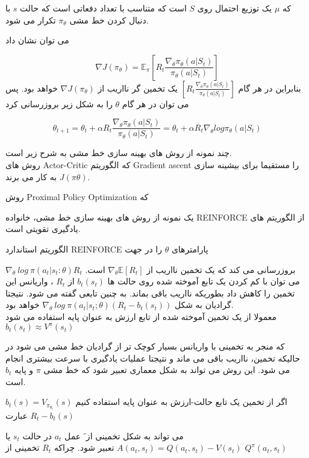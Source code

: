 که $\mu$ یک توزیع احتمال روی $S$ است که متناسب با تعداد دفعاتی است که حالت $s$ با دنبال کردن خط مشی 
$\pi_\theta$
 تکرار می شود.


می توان نشان داد 
\cite{(suttonbook)}

$$\nabla J(\pi_\theta) = \mathbb{E}_\pi \left[ R_t \frac{\nabla_\theta \pi_\theta (a|S_t)}{\pi_\theta (a|S_t)} \right]$$
بنابراین در هر گام
$\left[ R_t \frac{\nabla_\theta \pi_\theta (a|S_t)}{\pi_\theta (a|S_t)} \right]$
یک تخمین گر نااریب از $\nabla J(\pi_\theta)$ خواهد بود. پس می توان در هر گام $\theta$ را به شکل زیر بروزرسانی کرد

$$\theta_{t+1} = \theta_t + \alpha R_t \frac{\nabla_\theta \pi_\theta (a|S_t)}{\pi_\theta (a|S_t)} = \theta_t + \alpha R_t \nabla_\theta log \pi_\theta (a|S_t)$$

چند نمونه از روش های بهینه سازی خط مشی به شرح زیر است. \\
روش های Actor-Critic که الگوریتم Gradient ascent را مستقیما برای بیشینه سازی 
$J(\pi\theta)$
به کار می برند.

روش  Proximal Policy Optimization که


یک نمونه از روش های بهینه سازی خط مشی، خانواده REINFORCE از الگوریتم های یادگیری تقویتی است.
\cite{williams1992simple}

الگوریتم استاندارد REINFORCE پارامترهای $\theta$ را در جهت 

$\nabla_\theta \  log  \ \pi (a_t|s_t:\theta)R_t$
بروزرسانی می کند که یک تخمین نااریب از 
$\nabla_\theta \mathbb{E}[R_t]$
است. می توان  با کم کردن یک تابع آموخته شده روی حالت ها 
$b_t(s_t)$
از 
$R_t$
، واریانس این تخمین را کاهش داد بطوریکه نااریب باقی بماند. به چنین تابعی  گفته می شود. نتیجتا گرادیان به شکل
$\nabla_\theta \ log \ \pi(a_t|s_t;\theta) (R_t - b_t(s_t))$
خواهد بود. \\

معمولا از یک تخمین آموخته شده از تابع ارزش به عنوان پایه استفاده می شود
$b_t(s_t) \approx V^\pi (s_t)$

که منجر به تخمینی با واریانس بسیار کوچک تر از گرادیان خط مشی می \nf شود در حالیکه تخمین، نااریب باقی می ماند و نتیجتا عملیات یادگیری با سرعت بیشتری انجام می شود.
این روش می تواند به شکل معماری   تعبیر شود که خط مشی $\pi$  و پایه $b_t$  است. 


 اگر از تخمین یک تابع حالت-ارزش به عنوان پایه استفاده کنیم 
$b_t(s) = V_{\pi_{\theta_t}}(s)$
عبارت 
$R_t - b_t(s)$

می تواند به شکل تخمینی از  َ عمل $a_t$ در حالت $s_t$ یا 
$A(a_t,s_t)=Q(a_t,s_t)-V(s_t)$
تعبیر شود. چراکه $R_t$ تخمینی از 
$Q^\pi (a_t, s_t)$


